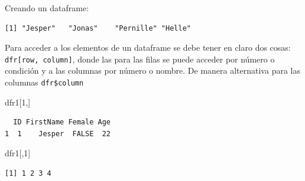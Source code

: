 \documentclass[
  letterpaper,
  DIV=11,
  numbers=noendperiod]{scrartcl}
\newenvironment{Shaded}{\begin{snugshade}}{\end{snugshade}}
\newcommand{\AttributeTok}[1]{\textcolor[rgb]{0.40,0.45,0.13}{#1}}
\newcommand{\DecValTok}[1]{\textcolor[rgb]{0.68,0.00,0.00}{#1}}
\newcommand{\FunctionTok}[1]{\textcolor[rgb]{0.28,0.35,0.67}{#1}}
\newcommand{\NormalTok}[1]{\textcolor[rgb]{0.00,0.23,0.31}{#1}}
\newcommand{\OtherTok}[1]{\textcolor[rgb]{0.00,0.23,0.31}{#1}}
\newcommand{\SpecialCharTok}[1]{\textcolor[rgb]{0.37,0.37,0.37}{#1}}
\newcommand{\StringTok}[1]{\textcolor[rgb]{0.13,0.47,0.30}{#1}}
\begin{document}
Creando un dataframe:

\begin{Shaded}
\end{Shaded}

\begin{verbatim}
[1] "Jesper"   "Jonas"    "Pernille" "Helle"   
\end{verbatim}

Para acceder a los elementos de un dataframe se debe tener en claro dos
cosas: \texttt{dfr{[}row,\ column{]}}, donde las para las filas se puede
acceder por número o condición y a las columnas por número o nombre. De
manera alternativa para las columnas \texttt{dfr\$column}

\begin{Shaded}
\begin{Highlighting}[]
\NormalTok{dfr1[}\DecValTok{1}\NormalTok{,]   }
\end{Highlighting}
\end{Shaded}

\begin{verbatim}
  ID FirstName Female Age
1  1    Jesper  FALSE  22
\end{verbatim}

\begin{Shaded}
\begin{Highlighting}[]
\NormalTok{dfr1[,}\DecValTok{1}\NormalTok{]  }
\end{Highlighting}
\end{Shaded}

\begin{verbatim}
[1] 1 2 3 4
\end{verbatim}

\begin{Shaded}
\end{Shaded}
\end{document}
